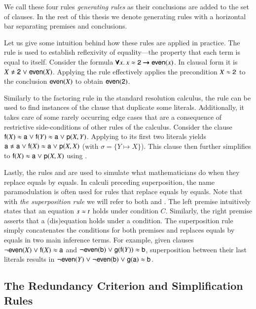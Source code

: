 \medskip
We call these four rules \emph{generating rules} as their conclusions are added to
the set of clauses. In the rest of this thesis we denote generating rules with a
horizontal bar separating premises and conclusions.

Let us give some intuition behind how these rules are applied in practice. The
 rule is used to establish reflexivity of equality---the property
that each term is equal to itself. Consider the formula $\pmb{\forall} x.\,  x \approx
\mathsf{2} \pmb{\rightarrow} \mathsf{even}(x)$. In clausal form it is $X \noteq \cst{2} \llor
\cst{even}(X)$. Applying the  rule effectively applies the
precondition $X \approx \mathsf{2}$ to the conclusion $\mathsf{even}(X)$ to obtain
$\mathsf{even}(\mathsf{2})$. 

Similarly to the factoring rule in the standard resolution calculus, the
 rule can be used to find instances of the clause that duplicate
some literals.
Additionally, it takes care of some rarely occurring edge cases that are a consequence of restrictive
side-conditions of other rules of the calculus. Consider the clause $\mathsf{f}(X)
\approx \mathsf{a} \mathrel\lor \mathsf{f}(Y) \approx \mathsf{a} \mathrel\lor \mathsf{p}(X, Y)$. Applying
 to its first two literals yields $\cst{a} \noteq \cst{a} \llor
\cst{f}(X) \eq \cst{a} \llor \cst{p}(X, X)$ (with $\sigma = \{ Y \mapsto X \}$).
This clause then further simplifies to $\mathsf{f}(X) \approx \mathsf{a} \mathrel\lor \mathsf{p}(X,
X)$ using .

Lastly, the rules  and  are used to simulate what
mathematicians do when they replace equals by equals. In calculi preceding
superposition, the name paramodulation is often used for rules that replace
equals by equals. Note that with \emph{the superposition rule} we will refer to both
 and . The left premise intuitively states that
an equation $s \approx t$ holds under condition $C$. Similarly, the right premise
asserts that a (dis)equation holds under a condition. The superposition rule
simply concatenates the conditions for both premises and replaces equals by
equals in two main inference terms. For example, given clauses $\neg
\mathsf{even}(X) \mathrel\lor \mathsf{f}(X) \approx \mathsf{a}$ and $\neg \mathsf{even}(\mathsf{b}) \mathrel\lor
\mathsf{g}(\mathsf{f}(Y)) \approx \mathsf{b}$, superposition between their last literals
results in $\neg \mathsf{even}(Y) \mathrel\lor \neg \mathsf{even}(\mathsf{b}) \mathrel\lor
\mathsf{g}(\mathsf{a}) \approx \mathsf{b}$.

\medskip

\subsection{The Redundancy Criterion and Simplification Rules}

